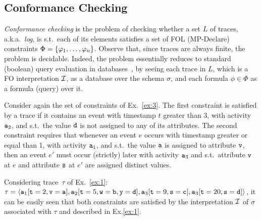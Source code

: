 \subsection{Conformance Checking}
\emph{Conformance checking} is the problem of checking whether a set $L$ of
traces, a.k.a.~\emph{log}, is s.t.~each of
its elements satisfies a set of FOL (MP-Declare) constraints
$\Phi=\{\varphi_1,\ldots,\varphi_n\}$.
Observe that, since traces are always finite, the problem is decidable.
Indeed, the problem essentially
reduces to standard (boolean) query evaluation in
databases~\cite{vianu-book}, by seeing
each trace in $L$, which is a FO interpretation $\mathcal{I}$,
as a database over the
schema $\sigma$, and each formula $\phi\in\Phi$ as a
formula (query) over it.


\begin{example}\label{ex:2}
Consider again the set of constraints of Ex.~\ref{ex:3}.
The first constraint is satisfied by a trace if it contains
an event with timestamp $t$ greater than 3,
with activity $\mathtt{a}_2$, and s.t.~the value $\mathtt{d}$ is
not assigned to any of its attributes.
The second constraint requires that whenever an event $e$ occurs
with
timestamp greater or equal than 1, with activity $\mathtt{a}_1$, and
s.t.~the value $\mathtt{a}$ is assigned to attribute $\mathtt{v}$, then
an event $e'$ must occur (strictly) later with activity
$\mathtt{a}_3$ and
s.t.~attribute $\mathtt{v}$ at $e$ and attribute
$\mathtt{s}$ at $e'$ are assigned distinct values.

Considering trace~$\tau$ of Ex.~\ref{ex:1}:
$\tau=\langle\mathtt{a}_1[
	\mathtt{t}=2,
	\mathtt{v}=\mathtt{a}
],
\mathtt{a}_2[
	\mathtt{t}=5,
	\mathtt{w}=\mathtt{b},
	\mathtt{y}=\mathtt{d}
],
\mathtt{a}_3[
	\mathtt{t}=9,
	\mathtt{s}=\mathtt{c}
],
\mathtt{a}_3[
	\mathtt{t}=20,
	\mathtt{s}=\mathtt{d}
]\rangle$, it can be easily seen that both constraints are satisfied by the
interpretation $\mathcal{I}$ of $\sigma$ associated with $\tau$ and described
in Ex.\ref{ex:1}.
\end{example}


